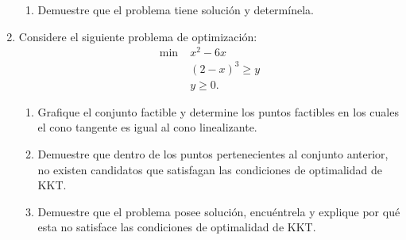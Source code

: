 \documentclass{article}
\begin{document}
\begin{enumerate}
\begin{enumerate}
			\item Demuestre que el problema tiene solución y determínela.
		\end{enumerate}
	\item Considere el siguiente problema de optimización:
		\begin{align*}
			\min \; & x^2 - 6x \\
				& (2 - x)^3 \geq y \\
				& y \geq 0.
		\end{align*}
		\begin{enumerate}
			\item Grafique el conjunto factible y determine los puntos factibles en los cuales el cono tangente es igual al cono linealizante.
			\item Demuestre que dentro de los puntos pertenecientes al conjunto anterior, no existen candidatos que satisfagan las condiciones de optimalidad de KKT.
			\item Demuestre que el problema posee solución, encuéntrela y explique por qué esta no satisface las condiciones de optimalidad de KKT.
		\end{enumerate}

\end{enumerate}
\end{document}
